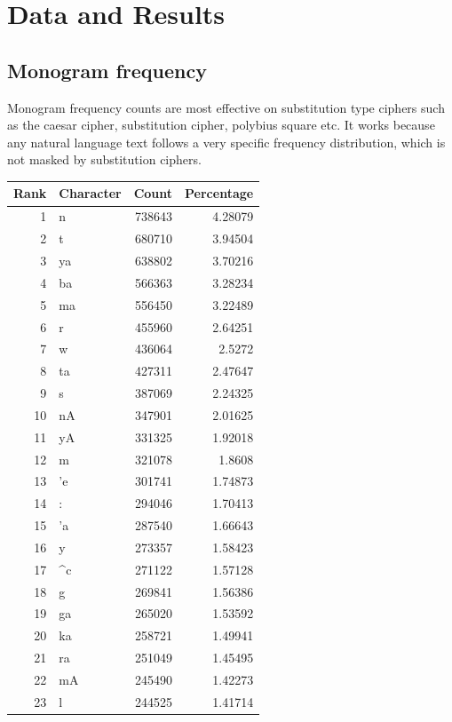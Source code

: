\section{Data and Results}

\subsection{Monogram frequency}
Monogram frequency counts are most effective on substitution type ciphers such as the caesar cipher, substitution cipher, polybius square etc. It works because any natural language text follows a very specific frequency distribution, which is not masked by substitution ciphers\cite{text_characterisation}.

\begin{table}[h!]
    \begin{center}
        \begin{tabular}{|| r | l | r | r ||}
            \hline
            \foreignlanguage{english}{Rank} & 
            \foreignlanguage{english}{Character} &
            \foreignlanguage{english}{Count} & 
            \foreignlanguage{english}{Percentage} \\
            \hline
            \hline
            1 & n & 738643 & 4.28079 \\
            2 & t & 680710 & 3.94504 \\
            3 & ya & 638802 & 3.70216 \\
            4 & ba & 566363 & 3.28234 \\
            5 & ma & 556450 & 3.22489 \\
            6 & r & 455960 & 2.64251 \\
            7 & w & 436064 & 2.5272 \\
            8 & ta & 427311 & 2.47647 \\
            9 & s & 387069 & 2.24325 \\
            10 & nA & 347901 & 2.01625 \\
            11 & yA & 331325 & 1.92018 \\
            12 & m & 321078 & 1.8608 \\
            13 & 'e & 301741 & 1.74873 \\
            14 & : & 294046 & 1.70413 \\
            15 & 'a & 287540 & 1.66643 \\
            16 & y & 273357 & 1.58423 \\
            17 & ^c & 271122 & 1.57128 \\
            18 & g & 269841 & 1.56386 \\
            19 & ga & 265020 & 1.53592 \\
            20 & ka & 258721 & 1.49941 \\
            21 & ra & 251049 & 1.45495 \\
            22 & mA & 245490 & 1.42273 \\
            23 & l & 244525 & 1.41714  \\
            \hline
        \end{tabular}
    

\end{center}
\end{table}
